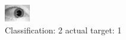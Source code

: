 \begin{figure}[h!]
\begin{center}
\includegraphics[width=0.60\columnwidth]{figures/ID1563_class_2_target_1.png}
\end{center}
\caption{ Classification: 2 actual target: 1}
\label{fig:ID1563_class_2_target_1}
\end{figure}
